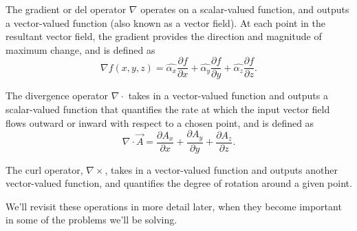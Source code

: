 \documentclass{article}
\begin{document}
The gradient or del operator	\(\nabla\) operates on a scalar-valued function, and outputs a vector-valued function (also known as a vector field). At each point in the resultant vector field, the gradient provides the direction and magnitude of maximum change, and is defined as \[\nabla f(x,y,z) = \hat{\alpha_x}\frac{\partial f}{\partial x} + \hat{\alpha_y}\frac{\partial f}{\partial y} + \hat{\alpha_z}\frac{\partial f}{\partial z}.\]

The divergence operator \(\nabla \cdot \) takes in a vector-valued function and outputs a scalar-valued function that quantifies the rate at which the input vector field flows outward or inward with respect to a chosen point, and is defined as \[\nabla \cdot \vec{A} = \frac{\partial A_x}{\partial x} + \frac{\partial A_y}{\partial y} + \frac{\partial A_z}{\partial z}.\]

The curl operator, \(\nabla \times \), takes in a vector-valued function and outputs another vector-valued function, and quantifies the degree of rotation around a given point.

We'll revisit these operations in more detail later, when they become important in some of the problems we'll be solving.
\end{document}
